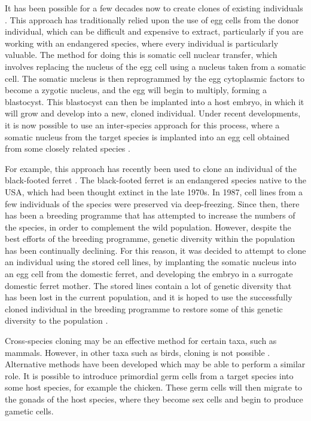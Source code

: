 \documentclass[10pt]{article}
\begin{document}
	It has been possible for a few decades now to create clones of existing individuals \citep{campbellSheepClonedNuclear1996}.
	This approach has traditionally relied upon the use of egg cells from the donor
	individual, which can be difficult and expensive to extract, particularly if you are
	working with an endangered species, where every individual is particularly valuable.
	The method for doing this is somatic cell nuclear transfer, which involves replacing
	the nucleus of the egg cell using a nucleus taken from a somatic cell. The somatic
	nucleus is then reprogrammed by the egg cytoplasmic factors to become a zygotic nucleus,
	and the egg will begin to multiply, forming a blastocyst. This blastocyst can then be
	implanted into a host embryo, in which it will grow and develop into a new, cloned
	individual. Under recent developments, it is now possible to use an inter-species
	approach for this process, where a somatic nucleus from the target species is
	implanted into an egg cell obtained from some closely related species \citep{loiGeneticRescueEndangered2001}.
	
	For example, this approach has recently been used to clone an individual of the black-footed ferret
	\citep{frittsConservationFirstCloned2022, wiselyRoadMap21st2015, sandlerEthicalAnalysisCloning2021}. The black-footed ferret is an endangered species native to the 
	USA, which had been thought extinct in the late 1970s. In 1987, cell lines from a few
	individuals of the species were preserved via deep-freezing. Since then, there has been
	a breeding programme that has attempted to increase the numbers of the species, in order
	to complement the wild population. However, despite the best efforts of the breeding
	programme, genetic diversity within the population has been continually declining. For
	this reason, it was decided to attempt to clone an individual using the stored cell
	lines, by implanting the somatic nucleus into an egg cell from the domestic ferret, 
	and developing the embryo in a surrogate domestic ferret mother. The stored lines contain
	a lot of genetic diversity that has been lost in the current population, and it is hoped
	to use the successfully cloned individual in the breeding programme to restore some of
	this genetic diversity to the population \citep{frittsConservationFirstCloned2022}.
	
	Cross-species cloning may be an effective method for certain taxa, such as mammals.
	However, in other taxa such as birds, cloning is not possible \citep{frittsConservationFirstCloned2022}. Alternative methods
	have been developed which may be able to perform a similar role. It is possible to 
	introduce primordial germ cells from a target species into some host species, for
	example the chicken. These germ cells will then migrate to the gonads of the host
	species, where they become sex cells and begin to produce gametic cells.
	
\end{document}
